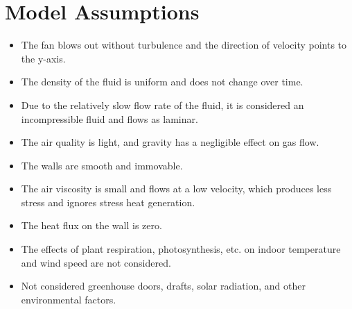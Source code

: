 \documentclass{apmcmthesis}
\begin{document}
\section{Model Assumptions}
\begin{itemize}
\item 
The fan blows out without turbulence and the direction of velocity points to the y-axis.
\item
The density of the fluid is uniform and does not change over time.
\item
Due to the relatively slow flow rate of the fluid, it is considered an incompressible fluid and flows as laminar.
\item 
The air quality is light, and gravity has a negligible effect on gas flow.
\item
The walls are smooth and immovable.
\item
The air viscosity is small and flows at a low velocity, which produces less stress and ignores stress heat generation.
\item
The heat flux on the wall is zero.
\item
The effects of plant respiration, photosynthesis, etc. on indoor temperature and wind speed are not considered.
\item
Not considered greenhouse doors, drafts, solar radiation, and other environmental factors.
\end{itemize}

\end{document}
